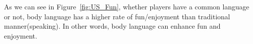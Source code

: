 
As we can see in Figure~\ref{fig:US_Fun}, whether players have a common language or not, body language has a higher rate of fun/enjoyment than traditional manner(speaking). In other words, body language can enhance fun and enjoyment.







